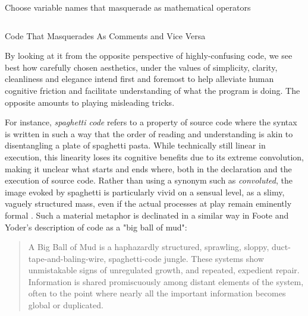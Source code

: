 \begin{listing}
  \inputminted{python}{./corpus/unmaintainable.py}
  \caption{Choose variable names that masquerade as mathematical operators}
  \label{code:green_unmaintainable}
\end{listing}

\begin{listing}
  \inputminted{c}{./corpus/unmaintainable_2.c}
  \caption{Code That Masquerades As Comments and Vice Versa}
  \label{code:green_unmaintainable_2}
\end{listing}

By looking at it from the opposite perspective of highly-confusing code, we see best how carefully chosen aesthetics, under the values of simplicity, clarity, cleanliness and elegance intend first and foremost to help alleviate human cognitive friction and facilitate understanding of what the program is doing. The opposite amounts to playing misleading tricks.

For instance, \emph{spaghetti code} refers to a property of source code where the syntax is written in such a way that the order of reading and understanding is akin to disentangling a plate of spaghetti pasta. While technically still linear in execution, this linearity loses its cognitive benefits due to its extreme convolution, making it unclear what starts and ends where, both in the declaration and the execution of source code. Rather than using a synonym such as \emph{convoluted}, the image evoked by spaghetti is particularly vivid on a sensual level, as a slimy, vaguely structured mass, even if the actual processes at play remain eminently formal \citep{steele_macaroni_1977}. Such a material metaphor is declinated in a similar way in Foote and Yoder's description of code as a "big ball of mud":

\begin{quote}
  A Big Ball of Mud is a haphazardly structured, sprawling, sloppy, duct-tape-and-baling-wire, spaghetti-code jungle. These systems show unmistakable signs of unregulated growth, and repeated, expedient repair. Information is shared promiscuously among distant elements of the system, often to the point where nearly all the important information becomes global or duplicated. \citep{foote_big_1997}
\end{quote}

